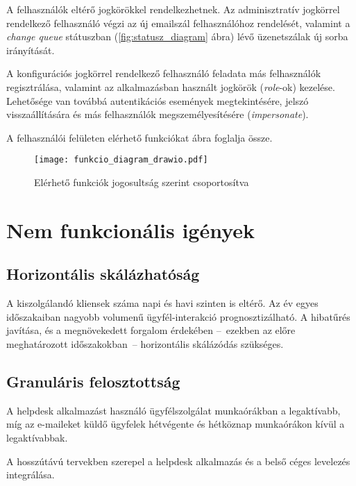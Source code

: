A felhasználók eltérő jogkörökkel rendelkezhetnek. Az adminisztratív jogkörrel rendelkező felhasználó végzi az új emailszál felhasználóhoz rendelését, valamint a \foreignlanguage{british}{\emph{change queue}} státuszban (\ref{fig:statusz_diagram} ábra) lévő üzenetszálak új sorba irányítását.

A konfigurációs jogkörrel rendelkező felhasználó feladata más felhasználók regisztrálása, valamint az alkalmazásban használt jogkörök (\foreignlanguage{british}{\emph{role}}-ok) kezelése. Lehetősége van továbbá autentikációs események megtekintésére, jelszó visszaállítására és más felhasználók megszemélyesítésére (\foreignlanguage{british}{\emph{impersonate}}).

A felhasználói felületen elérhető funkciókat  ábra foglalja össze.

\begin{figure}[hbt] 
	\centering
	\texttt{[image: funkcio\_diagram\_drawio.pdf]}
	\caption[Elérhető funkciók]{Elérhető funkciók jogosultság szerint csoportosítva}
	\label{fig:funkcio_diagram}
\end{figure}

\pagebreak
\section{Nem funkcionális igények}	


\subsection[Skálázhatóság]{Horizontális skálázhatóság}
A kiszolgálandó kliensek száma napi és havi szinten is eltérő. Az év egyes időszakaiban nagyobb volumenű ügyfél-interakció prognosztizálható. A hibatűrés javítása, és a megnövekedett forgalom érdekében --~ezekben az előre meghatározott időszakokban~--  horizontális skálázódás szükséges.


\subsection{Granuláris felosztottság}\label{sec:granularitas}
A \foreignlanguage{british}{helpdesk} alkalmazást használó ügyfélszolgálat munkaórákban a legaktívabb, míg az e-maileket küldő ügyfelek hétvégente és hétköznap munkaórákon kívül a legaktívabbak.

A hosszútávú tervekben szerepel a \foreignlanguage{british}{helpdesk} alkalmazás és a belső céges levelezés integrálása.

